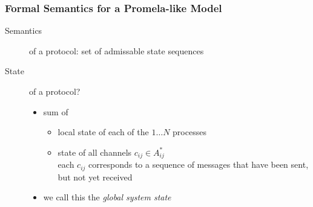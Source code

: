 \documentclass[a4paper, 10pt]{article}
\begin{document}
\subsubsection*{Formal Semantics for a Promela-like Model}
\begin{description}
    \item[Semantics] of a protocol: set of admissable state sequences
    \item[State] of a protocol?
    \begin{itemize}
        \item sum of
        \begin{itemize}
            \item local state of each of the $1\dots N$ processes
            \item state of all channels $c_{ij}\in A_{ij}^*$ \\
            each $c_{ij}$ corresponds to a sequence of messages that have been sent, but not yet received
        \end{itemize}
        \item we call this the \emph{global system state}
    \end{itemize}
\end{description}
\end{document}
